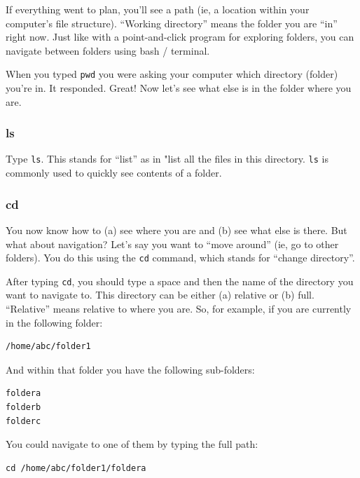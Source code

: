 \documentclass[
]{book}
\begin{document}
If everything went to plan, you'll see a path (ie, a location within your computer's file structure). ``Working directory'' means the folder you are ``in'' right now. Just like with a point-and-click program for exploring folders, you can navigate between folders using bash / terminal.

When you typed \texttt{pwd} you were asking your computer which directory (folder) you're in. It responded. Great! Now let's see what else is in the folder where you are.

\hypertarget{ls}{%
\subsubsection*{ls}\label{ls}}

Type \texttt{ls}. This stands for ``list'' as in "list all the files in this directory. \texttt{ls} is commonly used to quickly see contents of a folder.

\hypertarget{cd}{%
\subsubsection*{cd}\label{cd}}

You now know how to (a) see where you are and (b) see what else is there. But what about navigation? Let's say you want to ``move around'' (ie, go to other folders). You do this using the \texttt{cd} command, which stands for ``change directory''.

After typing \texttt{cd}, you should type a space and then the name of the directory you want to navigate to. This directory can be either (a) relative or (b) full. ``Relative'' means relative to where you are. So, for example, if you are currently in the following folder:

\begin{verbatim}
/home/abc/folder1
\end{verbatim}

And within that folder you have the following sub-folders:

\begin{verbatim}
foldera
folderb
folderc
\end{verbatim}

You could navigate to one of them by typing the full path:

\begin{verbatim}
cd /home/abc/folder1/foldera
\end{verbatim}
\end{document}
